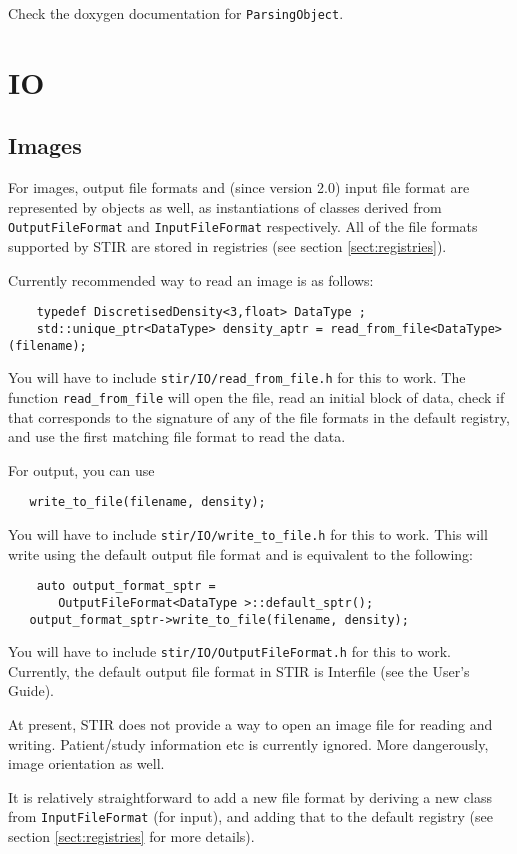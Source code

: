 \documentclass{article}
\begin{document}
Check the doxygen documentation for
\texttt{ParsingObject}.

\section{
IO \label{sect:IO}}

\subsection{Images}
For images, output file formats and (since version 2.0) input file format are represented 
by objects as well, as instantiations of classes derived from 
\texttt{OutputFileFormat} and \texttt{InputFileFormat} respectively. All of
the file formats supported by STIR are stored in registries (see section \ref{sect:registries}).

Currently recommended way to read an image is as follows:
\begin{verbatim}
    typedef DiscretisedDensity<3,float> DataType ;
    std::unique_ptr<DataType> density_aptr = read_from_file<DataType>(filename);
\end{verbatim}
You will have to include \texttt{stir/IO/read\_from\_file.h} for this to work. The function
\texttt{read\_from\_file} will open the file, read an initial block of data, check
if that corresponds to the signature of any of the file formats in the
default registry, and use the first matching file format to read the data.

For output, you can use
\begin{verbatim}
   write_to_file(filename, density);
\end{verbatim}
You will have to include \texttt{stir/IO/write\_to\_file.h} for this to work. This
will write using the default output file format and is equivalent to the following:
\begin{verbatim}
    auto output_format_sptr =
       OutputFileFormat<DataType >::default_sptr();
   output_format_sptr->write_to_file(filename, density);
\end{verbatim}
You will have to include \texttt{stir/IO/OutputFileFormat.h} for this to work.
Currently, the default output file format in STIR is Interfile (see the User's Guide).

At present, STIR does not provide a way to open an image file for reading and writing.
Patient/study information etc is currently ignored. More dangerously, image orientation
as well.

It is relatively straightforward to add a new file format by deriving a new class
from \texttt{InputFileFormat} (for input), and adding that to the default registry
(see section \ref{sect:registries} for more details).
\end{document}
